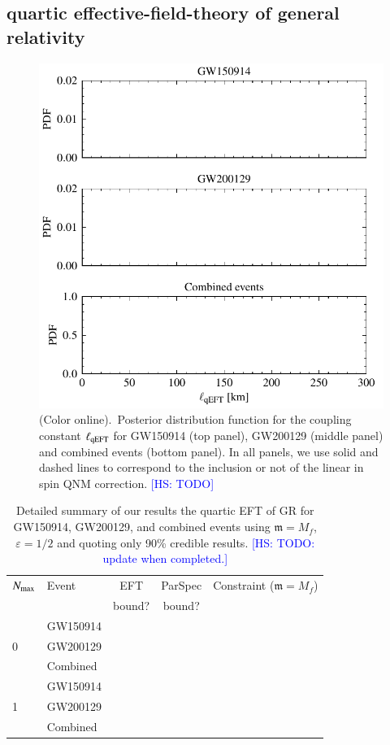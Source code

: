 \documentclass[twocolumn,
               prd,
               aps,
               superscriptaddress,
               tightenlines,
               nofootinbib,
               eqsecnum,
               amsfonts,
               amsmath,
               longbibliography]{revtex4-1}
\newcommand{\gm}{\mathfrak{m}}
\newcommand{\hs}[1]{{\textcolor{blue}{{[HS: #1]}} }}
\begin{document}
\subsection{quartic effective-field-theory of general relativity}
\label{sec:results_qeft}

\begin{figure}[t]
\includegraphics[width=\columnwidth]{figs/qeft_posteriors_combined.pdf}
\caption{(Color online).~Posterior distribution function for the coupling constant $\ell_{\rm qEFT}$ for
GW150914 (top panel), GW200129 (middle panel) and combined events (bottom panel).
%
In all panels, we use solid and dashed lines to correspond to the inclusion or not of the linear
in spin QNM correction.
%
\hs{TODO}
}
\label{fig:qEFT_exec_sum}
\end{figure}

\begin{table}[h]
\begin{tabular}{l l c c c}
\hline
\hline
$N_{\rm max}$ & Event & EFT    & ParSpec & Constraint ($\gm = M_{f}$) \\
              &       & bound? & bound?  &                            \\
\hline
  & GW150914 &  &     &    \\
0 & GW200129 &  &     &    \\
  & Combined &  &     &    \\
\hline
  & GW150914 &  &     &    \\
1 & GW200129 &  &     &    \\
  & Combined &  &     &    \\
\hline
\hline
\end{tabular}
\caption{Detailed summary of our results the quartic EFT of GR for GW150914, GW200129, and
combined events using $\gm = M_{f}$, $\varepsilon = 1/2$ and quoting only 90\% credible results.
%
\hs{TODO: update when completed.}
}
\label{tab:summary_qeft}
\end{table}
\end{document}
